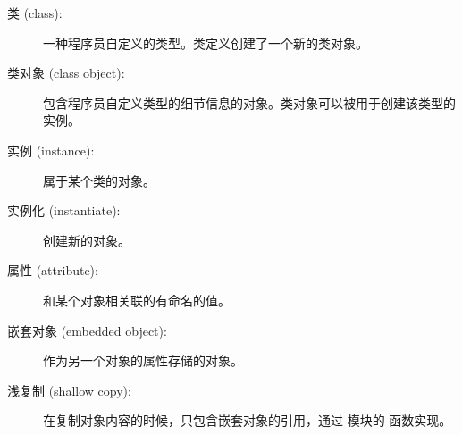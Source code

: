\begin{description}


\item[类 (class):]
一种程序员自定义的类型。类定义创建了一个新的类对象。
    


\item[类对象 (class object):]包含程序员自定义类型的细节信息的对象。类对象可以被用于创建该类型的实例。

  


\item[实例 (instance):]
属于某个类的对象。


\item[实例化 (instantiate):]
创建新的对象。


\item[属性 (attribute):]
和某个对象相关联的有命名的值。
  


\item[嵌套对象 (embedded object):]
作为另一个对象的属性存储的对象。
  


\item[浅复制 (shallow copy):]
在复制对象内容的时候，只包含嵌套对象的引用，通过  模块的  函数实现。


\end{description}
